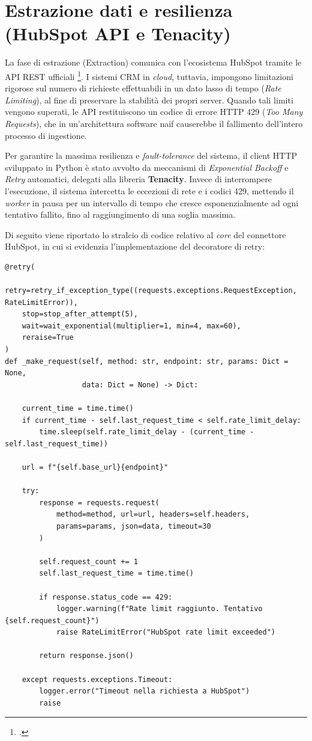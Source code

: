 \documentclass[12pt, a4paper]{report}
\begin{document}
\section{Estrazione dati e resilienza (HubSpot API e Tenacity)}
La fase di estrazione (Extraction) comunica con l'ecosistema HubSpot tramite le API REST ufficiali \footcite{hubspot_api}. I sistemi CRM in \textit{cloud}, tuttavia, impongono limitazioni rigorose sul numero di richieste effettuabili in un dato lasso di tempo (\textit{Rate Limiting}), al fine di preservare la stabilità dei propri server. Quando tali limiti vengono superati, le API restituiscono un codice di errore HTTP 429 (\textit{Too Many Requests}), che in un'architettura software naif causerebbe il fallimento dell'intero processo di ingestione.

Per garantire la massima resilienza e \textit{fault-tolerance} del sistema, il client HTTP sviluppato in Python è stato avvolto da meccanismi di \textit{Exponential Backoff} e \textit{Retry} automatici, delegati alla libreria \textbf{Tenacity}. Invece di interrompere l'esecuzione, il sistema intercetta le eccezioni di rete e i codici 429, mettendo il \textit{worker} in pausa per un intervallo di tempo che cresce esponenzialmente ad ogni tentativo fallito, fino al raggiungimento di una soglia massima. 

Di seguito viene riportato lo stralcio di codice relativo al \textit{core} del connettore HubSpot, in cui si evidenzia l'implementazione del decoratore di retry:

\begin{verbatim}
@retry(
    retry=retry_if_exception_type((requests.exceptions.RequestException, RateLimitError)),
    stop=stop_after_attempt(5),
    wait=wait_exponential(multiplier=1, min=4, max=60),
    reraise=True
)
def _make_request(self, method: str, endpoint: str, params: Dict = None, 
                  data: Dict = None) -> Dict:
    
    current_time = time.time()
    if current_time - self.last_request_time < self.rate_limit_delay:
        time.sleep(self.rate_limit_delay - (current_time - self.last_request_time))
    
    url = f"{self.base_url}{endpoint}"
    
    try:
        response = requests.request(
            method=method, url=url, headers=self.headers,
            params=params, json=data, timeout=30
        )
        
        self.request_count += 1
        self.last_request_time = time.time()
        
        if response.status_code == 429:
            logger.warning(f"Rate limit raggiunto. Tentativo {self.request_count}")
            raise RateLimitError("HubSpot rate limit exceeded")
            
        return response.json()
        
    except requests.exceptions.Timeout:
        logger.error("Timeout nella richiesta a HubSpot")
        raise
\end{verbatim}
\end{document}
